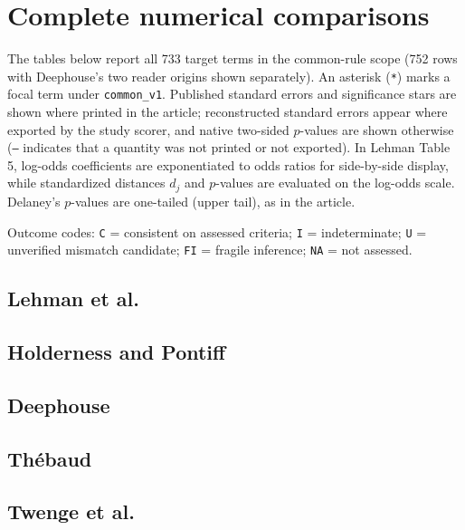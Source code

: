 \documentclass[11pt]{article}
\begin{document}
\clearpage
\section{Complete numerical comparisons}\label{sec:comparisons}
The tables below report all 733 target terms in the common-rule scope (752 rows with Deephouse's two reader origins shown separately). An asterisk (\texttt{*}) marks a focal term under \texttt{common\_v1}. Published standard errors and significance stars are shown where printed in the article; reconstructed standard errors appear where exported by the study scorer, and native two-sided $p$-values are shown otherwise (\texttt{--} indicates that a quantity was not printed or not exported). In Lehman Table 5, log-odds coefficients are exponentiated to odds ratios for side-by-side display, while standardized distances $d_j$ and $p$-values are evaluated on the log-odds scale. Delaney's $p$-values are one-tailed (upper tail), as in the article.

Outcome codes: \texttt{C} = consistent on assessed criteria; \texttt{I} = indeterminate; \texttt{U} = unverified mismatch candidate; \texttt{FI} = fragile inference; \texttt{NA} = not assessed.

\subsection{Lehman et al.}\label{sec:tables-lehman2011}

\clearpage
\subsection{Holderness and Pontiff}\label{sec:tables-holderness2012}

\clearpage
\subsection{Deephouse}\label{sec:tables-deephouse1999}

\clearpage
\subsection{Th\'ebaud}\label{sec:tables-thebaud2015}

\clearpage
\subsection{Twenge et al.}\label{sec:tables-twenge2010}

\clearpage
\end{document}
